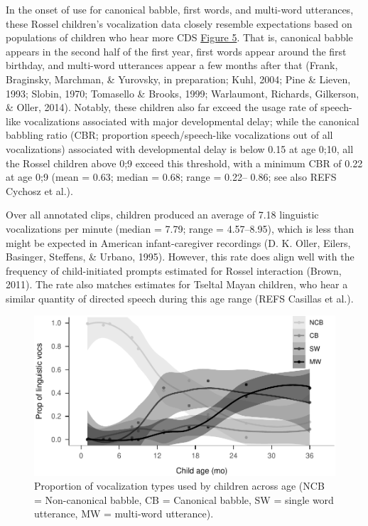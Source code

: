 \documentclass[,man,floatsintext]{apa6}
\begin{document}
In the onset of use for canonical babble, first words, and multi-word
utterances, these Rossel children's vocalization data closely resemble
expectations based on populations of children who hear more CDS
\protect\hyperlink{fig5}{Figure 5}. That is, canonical babble appears in
the second half of the first year, first words appear around the first
birthday, and multi-word utterances appear a few months after that
(Frank, Braginsky, Marchman, \& Yurovsky, in preparation; Kuhl, 2004;
Pine \& Lieven, 1993; Slobin, 1970; Tomasello \& Brooks, 1999;
Warlaumont, Richards, Gilkerson, \& Oller, 2014). Notably, these
children also far exceed the usage rate of speech-like vocalizations
associated with major developmental delay; while the canonical babbling
ratio (CBR; proportion speech/speech-like vocalizations out of all
vocalizations) associated with developmental delay is below 0.15 at age
0;10, all the Rossel children above 0;9 exceed this threshold, with a
minimum CBR of 0.22 at age 0;9 (mean = 0.63; median = 0.68; range =
0.22-- 0.86; see also REFS Cychosz et al.).

Over all annotated clips, children produced an average of 7.18
linguistic vocalizations per minute (median = 7.79; range = 4.57--8.95),
which is less than might be expected in American infant-caregiver
recordings (D. K. Oller, Eilers, Basinger, Steffens, \& Urbano, 1995).
However, this rate does align well with the frequency of child-initiated
prompts estimated for Rossel interaction (Brown, 2011). The rate also
matches estimates for Tseltal Mayan children, who hear a similar
quantity of directed speech during this age range (REFS Casillas et
al.).

\begin{figure}
\centering
\includegraphics{Yeli-CLE_files/figure-latex/fig5-1.pdf}
\caption{\label{fig:fig5}Proportion of vocalization types used by children
across age (NCB = Non-canonical babble, CB = Canonical babble, SW =
single word utterance, MW = multi-word utterance).}
\end{figure}
\end{document}
